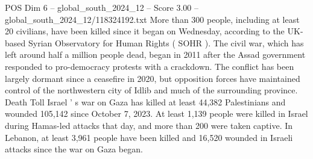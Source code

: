 \begin{textsample}{POS Dim 6 – global\_south\_2024\_12 – Score 3.00 – global\_south\_2024\_12/118324192.txt}
More than 300 people, including at least 20 civilians, have been killed since it began on Wednesday, according to the UK-based Syrian Observatory for Human Rights ( SOHR ).
The civil war, which has left around half a million people dead, began in 2011 after the Assad government responded to pro-democracy protests with a crackdown.
The conflict has been largely dormant since a ceasefire in 2020, but opposition forces have maintained control of the northwestern city of Idlib and much of the surrounding province.
Death Toll Israel ' s war on Gaza has killed at least 44,382 Palestinians and wounded 105,142 since October 7, 2023.
At least 1,139 people were killed in Israel during Hamas-led attacks that day, and more than 200 were taken captive.
In Lebanon, at least 3,961 people have been killed and 16,520 wounded in Israeli attacks since the war on Gaza began.

\end{textsample}
